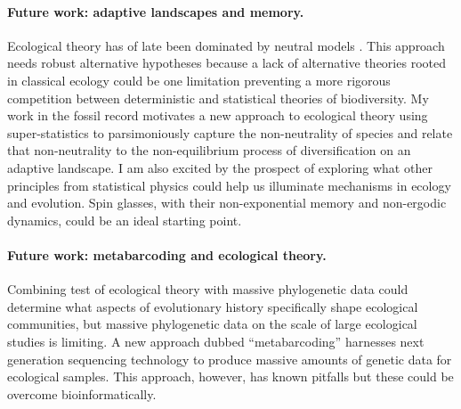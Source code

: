 \paragraph{Future work: adaptive landscapes and memory.}
Ecological theory has of late been dominated by neutral models
\citep[e.g.][]{rominger2009, rominger2015GEB}. This approach needs
robust alternative hypotheses because a lack of alternative theories
rooted in classical ecology could be one limitation preventing a more
rigorous competition between deterministic and statistical theories of
biodiversity. My work in the fossil record motivates a new approach to
ecological theory using super-statistics to parsimoniously capture the
non-neutrality of species and relate that non-neutrality to the
non-equilibrium process of diversification on an adaptive landscape. I
am also excited by the prospect of exploring what other principles
from statistical physics could help us illuminate mechanisms in
ecology and evolution. Spin glasses, with their non-exponential memory
and non-ergodic dynamics, could be an ideal starting point.

\paragraph{Future work: metabarcoding and ecological theory.}
Combining test of ecological theory with massive phylogenetic data
could determine what aspects of evolutionary history specifically
shape ecological communities, but massive phylogenetic data on the
scale of large ecological studies is limiting.  A new approach
dubbed ``metabarcoding'' \citep{taberlet2012} harnesses next
generation sequencing technology to produce massive amounts of genetic
data for ecological samples. This approach, however, has known
pitfalls but these could be overcome bioinformatically.

\printbibliography[heading=subbibliography]